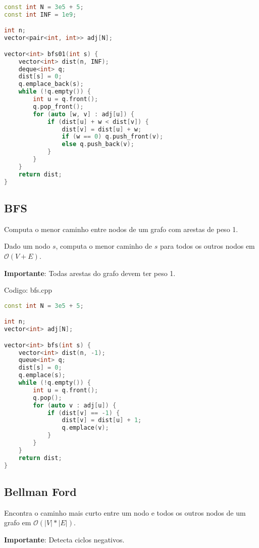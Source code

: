 \documentclass[10pt, a4paper, oneside]{book}
\begin{document}
\begin{lstlisting}[language=C++]
const int N = 3e5 + 5;
const int INF = 1e9;

int n;
vector<pair<int, int>> adj[N];

vector<int> bfs01(int s) {
    vector<int> dist(n, INF);
    deque<int> q;
    dist[s] = 0;
    q.emplace_back(s);
    while (!q.empty()) {
        int u = q.front();
        q.pop_front();
        for (auto [w, v] : adj[u]) {
            if (dist[u] + w < dist[v]) {
                dist[v] = dist[u] + w;
                if (w == 0) q.push_front(v);
                else q.push_back(v);
            }
        }
    }
    return dist;
}\end{lstlisting}
\hfill

\subsection{BFS}


Computa o menor caminho entre nodos de um grafo com arestas de peso 1.



Dado um nodo $s$, computa o menor caminho de $s$ para todos os outros nodos em $\mathcal{O}(V + E)$.



\textbf{Importante}: Todas arestas do grafo devem ter peso 1.
\hfill

Codigo: bfs.cpp

\begin{lstlisting}[language=C++]
const int N = 3e5 + 5;

int n;
vector<int> adj[N];

vector<int> bfs(int s) {
    vector<int> dist(n, -1);
    queue<int> q;
    dist[s] = 0;
    q.emplace(s);
    while (!q.empty()) {
        int u = q.front();
        q.pop();
        for (auto v : adj[u]) {
            if (dist[v] == -1) {
                dist[v] = dist[u] + 1;
                q.emplace(v);
            }
        }
    }
    return dist;
}\end{lstlisting}
\hfill

\subsection{Bellman Ford}


Encontra o caminho mais curto entre um nodo e todos os outros nodos de um grafo em $\mathcal{O}(|V| * |E|)$.



\textbf{Importante}: Detecta ciclos negativos.
\end{document}
